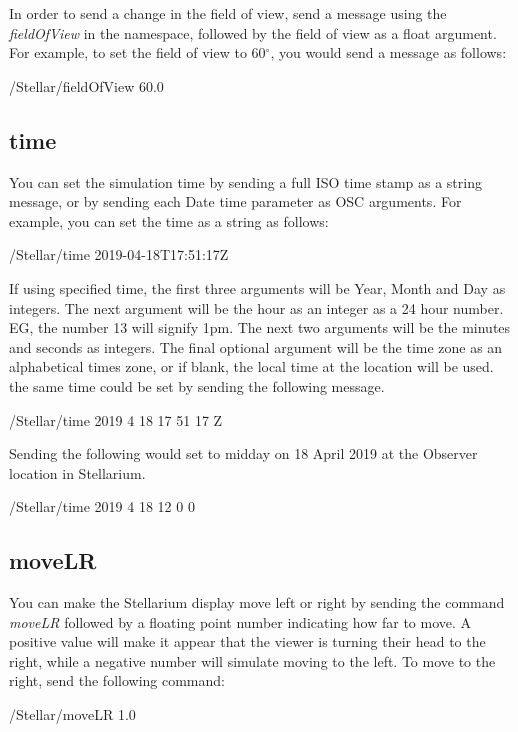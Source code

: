 In order to send a change in the field of view, send a message using the \textit{fieldOfView} in the namespace, followed by the field of view as a float argument. For example, to set the field of view to 60$^{\circ}$, you would send a message as follows:
 \begin{syntax}	
 	\medskip
	/Stellar/fieldOfView 60.0
	\medskip
 \end{syntax}
\bigskip

 \subsection{time}
You can set the simulation time by sending a full ISO time stamp as a string message, or by sending each Date time parameter as OSC arguments. For example, you can set the time as a string as follows:

\begin{syntax}	
	\medskip
	/Stellar/time 2019-04-18T17:51:17Z
	\medskip
\end{syntax}

If using specified time, the first three arguments will be  Year, Month and  Day as integers. The next  argument will be the hour as an integer as a 24 hour number. EG, the number 13 will signify 1pm. The next two arguments will be the minutes and seconds as integers.  The final optional argument will be the time zone as an alphabetical times zone, or if blank, the local time at the location will be used.  the same time could be set by sending the following message.
\begin{syntax}	
	\medskip
	/Stellar/time 2019 4 18 17 51 17 Z
	\medskip
\end{syntax}

Sending the following would set to midday on 18 April 2019 at the Observer location in Stellarium.

\begin{syntax}	
	\medskip
	/Stellar/time 2019 4 18 12 0 0 
	\medskip
\end{syntax}


\subsection{moveLR}
You can make the Stellarium display move left or right by sending the command \textit{moveLR} followed by a floating point number indicating how far to move. A positive value will make it appear that the viewer is turning their head to the right, while a negative number will simulate moving to the left. To move to the right, send the following command:
  \begin{syntax}	
 	\medskip
 	/Stellar/moveLR 1.0
 	\medskip
 \end{syntax}
 \bigskip

